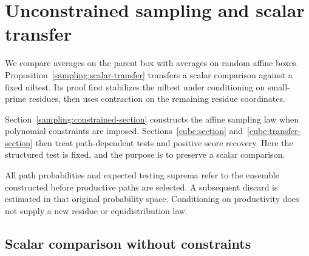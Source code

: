 \section{Unconstrained sampling and scalar transfer}
\label{sampling:section}

We compare averages on the parent box with averages on random affine
boxes.  Proposition~\ref{sampling:scalar-transfer} transfers a scalar
comparison against a fixed niltest.  Its proof first stabilizes the
niltest under conditioning on small-prime residues, then uses contraction
on the remaining residue coordinates.

Section~\ref{sampling:constrained-section} constructs the affine
sampling law when polynomial constraints are imposed.
Sections~\ref{cube:section} and~\ref{cube:transfer-section} then treat
path-dependent tests and positive score recovery. Here the structured
test is fixed, and the purpose is to preserve a scalar comparison.

All path probabilities and expected testing suprema refer to the
ensemble constructed before productive paths are selected.  A subsequent
discard is estimated in that original probability space.  Conditioning
on productivity does not supply a new residue or equidistribution law.

\subsection{Scalar comparison without constraints}

